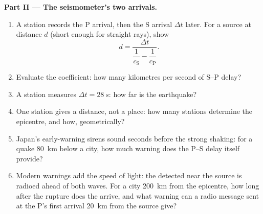 \begin{problem}
\medskip\noindent\textbf{Part II --- The seismometer's two arrivals.}
\begin{enumerate}[resume]
  \item A station records the P arrival, then the S arrival $\Delta t$
        later. For a source at distance $d$ (short enough for straight
        rays), show
        \[
        d = \frac{\Delta t}{\dfrac{1}{c_{\text{S}}} -
        \dfrac{1}{c_{\text{P}}}} .
        \]
  \item Evaluate the coefficient: how many kilometres per second of
        S--P delay?
  \item A station measures $\Delta t = \qty{28}{s}$: how far is the
        earthquake?
  \item One station gives a distance, not a place: how many stations
        determine the epicentre, and how, geometrically?
  \item Japan's early-warning sirens sound seconds before the strong
        shaking: for a quake \qty{80}{km} below a city, how much
        warning does the P--S delay itself provide?
  \item Modern warnings add the speed of light: the  detected
        near the source is radioed ahead of both waves. For a city
        \qty{200}{km} from the epicentre, how long after the rupture
        does the  arrive, and what warning can a radio message
        sent at the P's first arrival \qty{20}{km} from the source
        give?
\end{enumerate}


\end{problem}
